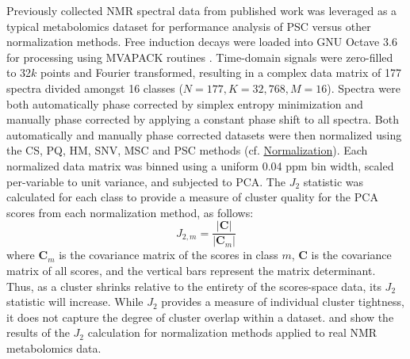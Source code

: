 \begin{doublespace}
Previously collected \hnmr{} NMR spectral data from published work
\cite{halouska:acscb2012} was leveraged as a typical metabolomics dataset
for performance analysis of PSC versus other normalization methods. Free
induction decays were loaded into GNU Octave 3.6 \cite{eaton2008} for
processing using MVAPACK routines \cite{worley:acscb2014}. Time-domain signals
were zero-filled to 32$k$ points and Fourier transformed, resulting in
a complex data matrix of 177 spectra divided amongst 16 classes
($N = 177, K = 32,768, M = 16$). Spectra were both automatically phase
corrected by simplex entropy minimization \cite{chen:jmr2002} and manually
phase corrected by applying a constant phase shift to all spectra. Both
automatically and manually phase corrected datasets were then normalized using
the CS, PQ, HM, SNV, MSC and PSC methods
(cf. \hyperlink{subsection.3.4.3}{Normalization}).
Each normalized data matrix was binned using a uniform 0.04 ppm bin width,
scaled per-variable to unit variance, and subjected to PCA. The $J_2$ statistic
\cite{koutroumbas2006} was calculated for each class to provide a measure of
cluster quality for the PCA scores from each normalization method, as follows:
\begin{equation}
J_{2,m} = \frac{|\mathbf{C}|}{|\mathbf{C}_m|}
\end{equation}
where $\mathbf{C}_m$ is the covariance matrix of the scores in class $m$,
$\mathbf{C}$ is the covariance matrix of all scores, and the vertical bars
represent the matrix determinant. Thus, as a cluster shrinks relative to the
entirety of the scores-space data, its $J_2$ statistic will increase. While
$J_2$ provides a measure of individual cluster tightness, it does not capture
the degree of cluster overlap within a dataset.  and
 show the results of the $J_2$ calculation for normalization
methods applied to real \hnmr{} NMR metabolomics data.
\end{doublespace}

